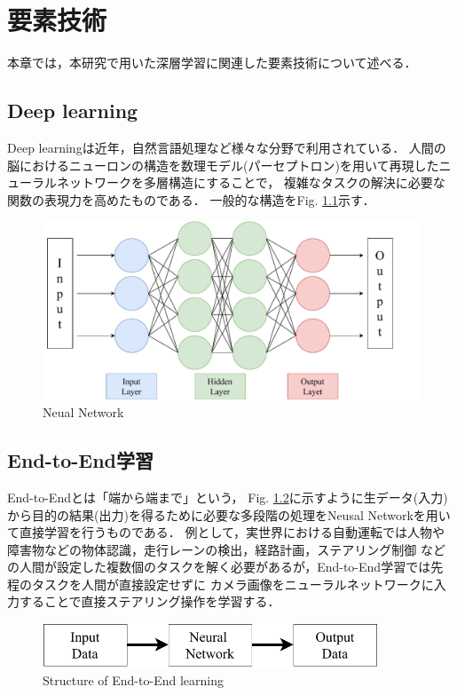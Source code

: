 \chapter{要素技術}
本章では，本研究で用いた深層学習に関連した要素技術について述べる．

\section{Deep learning}
Deep learningは近年，自然言語処理など様々な分野で利用されている．
人間の脳におけるニューロンの構造を数理モデル(パーセプトロン)を用いて再現したニューラルネットワークを多層構造にすることで，
複雑なタスクの解決に必要な関数の表現力を高めたものである．
一般的な構造をFig. \ref{fig::network}示す．

\begin{figure}[h]
    \centering
    \includegraphics[width = 12cm]{./figs/net.pdf}
    \caption{Neual Network}
    \label{fig::network}
\end{figure}

\section{End-to-End学習}
End-to-Endとは「端から端まで」という，
Fig. \ref{fig::e2e}に示すように生データ(入力)から目的の結果(出力)を得るために必要な多段階の処理をNeusal Networkを用いて直接学習を行うものである．
例として，実世界における自動運転では人物や障害物などの物体認識，走行レーンの検出，経路計画，ステアリング制御
などの人間が設定した複数個のタスクを解く必要があるが，End-to-End学習では先程のタスクを人間が直接設定せずに
カメラ画像をニューラルネットワークに入力することで直接ステアリング操作を学習する．

\vspace{2.0zh}
\begin{figure}[h]
    \centering
    \includegraphics[width = 10cm]{./figs/e2e.pdf}
    \caption{Structure of End-to-End learning}
    \label{fig::e2e}
\end{figure}

